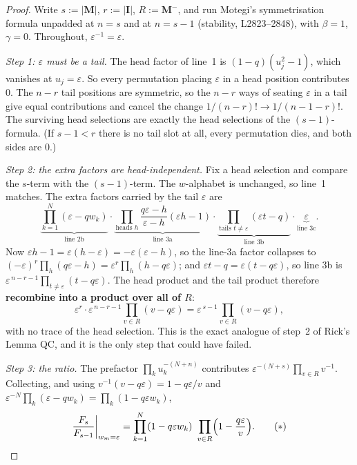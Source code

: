 \documentclass[11pt]{article}
\theoremstyle{plain}
\theoremstyle{definition}
\theoremstyle{remark}
\theoremstyle{plain}
\newcommand{\bI}{\mathbf{I}}
\newcommand{\bM}{\mathbf{M}}
\begin{document}
\begin{proof}
Write $s:=|\bM|$, $r:=|\bI|$, $R:=\bM^-$, and run Motegi's symmetrisation formula
unpadded at $n=s$ and at $n=s-1$ (stability, L2823--2848), with $\beta=1$,
$\gamma=0$.  Throughout, $\varepsilon^{-1}=\varepsilon$.

\emph{Step 1: $\varepsilon$ must be a tail.}  The head factor of line~1 is
$(1-q)(u_j^2-1)$, which vanishes at $u_j=\varepsilon$.  So every permutation
placing $\varepsilon$ in a head position contributes $0$.  The $n-r$ tail
positions are symmetric, so the $n-r$ ways of seating $\varepsilon$ in a tail
give equal contributions and cancel the change $1/(n-r)!\to1/(n-1-r)!$.  The
surviving head selections are exactly the head selections of the $(s-1)$-formula.
(If $s-1<r$ there is no tail slot at all, every permutation dies, and both sides
are $0$.)

\emph{Step 2: the extra factors are head-independent.}  Fix a head selection and
compare the $s$-term with the $(s-1)$-term.  The $w$-alphabet is unchanged, so
line~1 matches.  The extra factors carried by the tail $\varepsilon$ are
\[
  \underbrace{\textstyle\prod_{k=1}^{N}(\varepsilon-qw_k)}_{\text{line 2b}}\cdot
  \underbrace{\textstyle\prod_{\text{heads }h}\frac{q\varepsilon-h}{\varepsilon-h}(\varepsilon h-1)}_{\text{line 3a}}\cdot
  \underbrace{\textstyle\prod_{\text{tails }t\ne\varepsilon}(\varepsilon t-q)}_{\text{line 3b}}\cdot
  \underbrace{\varepsilon}_{\text{line 3c}} .
\]
Now $\varepsilon h-1=\varepsilon(h-\varepsilon)=-\varepsilon(\varepsilon-h)$, so the
line-3a factor collapses to $(-\varepsilon)^{r}\prod_h(q\varepsilon-h)
=\varepsilon^{r}\prod_h(h-q\varepsilon)$; and
$\varepsilon t-q=\varepsilon(t-q\varepsilon)$, so line 3b is
$\varepsilon^{\,n-r-1}\prod_{t\ne\varepsilon}(t-q\varepsilon)$.  The head product
and the tail product therefore \textbf{recombine into a product over all of $R$}:
\[
  \varepsilon^{r}\cdot\varepsilon^{\,n-r-1}\prod_{v\in R}(v-q\varepsilon)
  =\varepsilon^{\,s-1}\prod_{v\in R}(v-q\varepsilon),
\]
with no trace of the head selection.  This is the exact analogue of step~2 of
Rick's Lemma QC, and it is the only step that could have failed.

\emph{Step 3: the ratio.}  The prefactor $\prod_k u_k^{-(N+n)}$ contributes
$\varepsilon^{-(N+s)}\prod_{v\in R}v^{-1}$.  Collecting, and using
$v^{-1}(v-q\varepsilon)=1-q\varepsilon/v$ and
$\varepsilon^{-N}\prod_k(\varepsilon-qw_k)=\prod_k(1-q\varepsilon w_k)$,
\[
  \frac{F_{s}}{F_{s-1}}\bigg|_{w_m=\varepsilon}
  =\prod_{k=1}^{N}(1-q\varepsilon w_k)\ \prod_{v\in R}\Bigl(1-\frac{q\varepsilon}{v}\Bigr).
  \tag{$\ast$}
\]


\end{proof}
\end{document}
